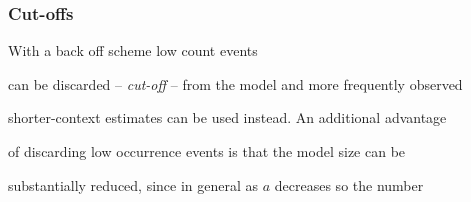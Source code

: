 


































\subsubsection{Cut-offs}


With a back off scheme low count events


can be discarded -- {\it cut-off} -- from the model and more frequently observed


shorter-context estimates can be used instead. An additional advantage


of discarding low occurrence events is that the model size can be


substantially reduced, since in general as $a$ decreases so the number


